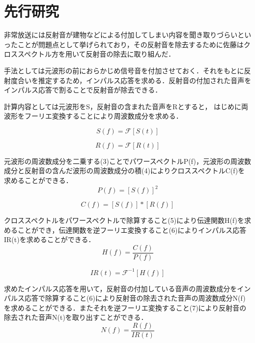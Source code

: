 \documentclass[a4j,12pt]{jarticle}
\begin{document}
\section{先行研究}

非常放送には反射音が建物などによる付加してしまい内容を聞き取りづらいといったことが問題点として挙げられており，その反射音を除去するために佐藤はクロススペクトル方を用いて反射音の除去に取り組んだ．

手法としては元波形の前におらかじめ信号音を付加させておく．それをもとに反射度合いを推定するため，インパルス応答を求める．反射音の付加された音声をインパルス応答で割ることで反射音が除去できる．

計算内容としては元波形をS，反射音の含まれた音声をRとすると，
はじめに両波形をフーリエ変換することにより周波数成分を求める．

\begin{equation}
  S(f) = \mathcal{F}[S(t)]
\end{equation}

\begin{equation}
  R(f) = \mathcal{F}[R(t)]
\end{equation}
 
元波形の周波数成分を二乗する(3)ことでパワースペクトルP(f)，元波形の周波数成分と反射音の含んだ波形の周波数成分の積(4)によりクロススペクトルC(f)を求めることができる．
\begin{equation}
  P(f) = [S(f)]^2
\end{equation}

\begin{equation}
  C(f) = [S(f)]*[R(f)]
\end{equation}

クロススペクトルをパワースペクトルで除算すること(5)により伝達関数H(f)を求めることができ，伝達関数を逆フーリエ変換すること(6)によりインパルス応答IR(t)を求めることができる．
\begin{equation}
  H(f) = \frac{C(f)}{P(f)}
\end{equation}

\begin{equation}
  IR(t) = \mathcal{F}^{-1}[H(f)]
\end{equation}

求めたインパルス応答を用いて，反射音の付加している音声の周波数成分をインパルス応答で除算すること(6)により反射音の除去された音声の周波数成分N(f)を求めることができる．またそれを逆フーリエ変換すること(7)により反射音の除去された音声N(t)を取り出すことができる．
\begin{equation}
  N(f) = \frac{R(f)}{IR(t)}
\end{equation}
\end{document}
